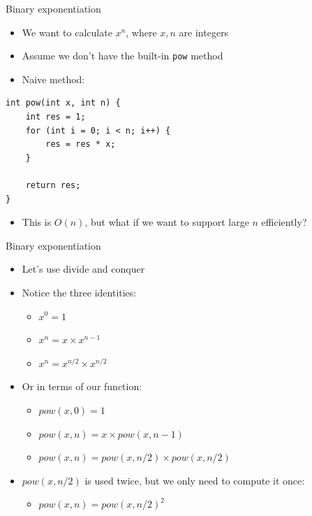 \documentclass{beamer}
\begin{document}
\begin{frame}{Binary exponentiation}
    \begin{itemize}
        \item We want to calculate $x^n$, where $x,n$ are integers
        \item Assume we don't have the built-in \texttt{pow} method
        \item Naive method:
    \end{itemize}

    \begin{verbatim}
int pow(int x, int n) {
    int res = 1;
    for (int i = 0; i < n; i++) {
        res = res * x;
    }

    return res;
}
    \end{verbatim}

    \begin{itemize}
        \item This is $O(n)$, but what if we want to support large $n$ efficiently?
    \end{itemize}
\end{frame}

\begin{frame}[plain]{Binary exponentiation}
    \begin{itemize}
        \item Let's use divide and conquer
        \vspace{10pt}
        \item Notice the three identities:

            \begin{itemize}
                \item $x^0 = 1$
                \item $x^n = x \times x^{n-1}$
                \item $x^n = x^{n/2} \times x^{n/2}$
            \end{itemize}

        \item Or in terms of our function:

            \begin{itemize}
                \item $pow(x,0) = 1$
                \item $pow(x,n) = x \times pow(x, n-1)$
                \item $pow(x,n) = pow(x, n/2) \times pow(x, n/2)$
            \end{itemize}

        \item $pow(x,n/2)$ is used twice, but we only need to compute it once:

            \begin{itemize}
                \item $pow(x,n) = pow(x, n/2)^2$
            \end{itemize}
    \end{itemize}
\end{frame}
\end{document}
